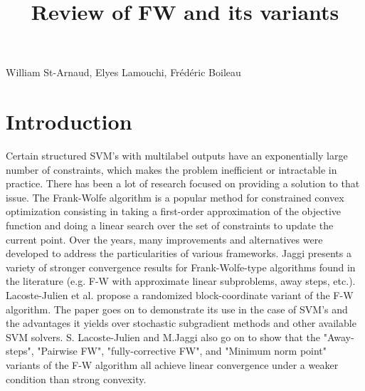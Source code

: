 \documentclass{article}
\title{Review of FW and its variants}
\date{}
\begin{document}
 

\maketitle


\vspace{-0.5in}
\begin{center}
William St-Arnaud, Elyes Lamouchi, Fr\'ed\'eric Boileau
\end{center}
\vspace{0.2in}



\section*{Introduction}
Certain structured SVM's with multilabel outputs have an exponentially large number of constraints, which makes the problem inefficient or intractable in practice. There has been a lot of research focused on providing a solution to that issue. The Frank-Wolfe algorithm \cite{f-w} is a popular method for constrained convex optimization consisting in taking a first-order approximation of the objective function and doing a linear search over the set of constraints to update the current point. Over the years, many improvements and alternatives were developed to address the particularities of various frameworks. Jaggi \cite{Jaggi:229246} presents a variety of stronger convergence results for Frank-Wolfe-type algorithms found in the literature (e.g. F-W with approximate linear subproblems, away steps, etc.). Lacoste-Julien et al. \cite{DBLP:journals/corr/abs-1207-4747} propose a randomized block-coordinate variant of the F-W algorithm. The paper goes on to demonstrate its use in the case of SVM's and the advantages it yields over stochastic subgradient methods and other available SVM solvers. S. Lacoste-Julien and M.Jaggi \cite{2015arXiv151105932L} also go on to show that the "Away-steps", "Pairwise FW", "fully-corrective FW", and "Minimum norm point" variants of the F-W algorithm all achieve linear convergence under a weaker condition than strong convexity. 
\end{document}
